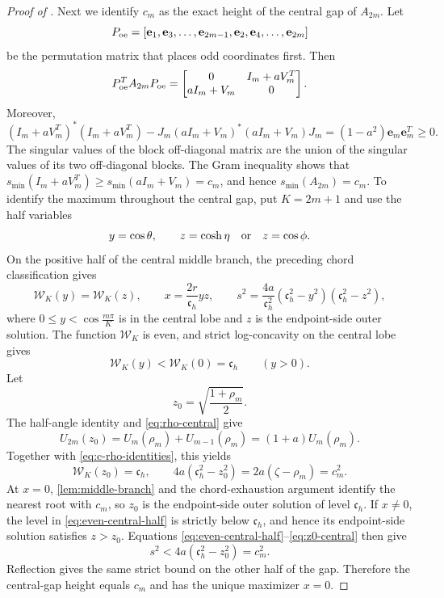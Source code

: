 \documentclass[12pt,anonymous]{iopjournal}
\numberwithin{equation}{section}
\theoremstyle{remark}
\begin{document}
\begin{proof}[Proof of ]
Next we identify \(c_m\) as the exact height of the central gap of
\(A_{2m}\).  Let
\[
 P_{\rm oe}=[\mathbf e_1,\mathbf e_3,\ldots,\mathbf e_{2m-1},
 \mathbf e_2,\mathbf e_4,\ldots,\mathbf e_{2m}]
\]
be the permutation matrix that places odd coordinates first.  Then
\[
 P_{\rm oe}^T A_{2m}P_{\rm oe}=
 \begin{bmatrix}0&I_m+aV_m^T\\aI_m+V_m&0\end{bmatrix}.
\]
Moreover,
\[
 (I_m+aV_m^T)^*(I_m+aV_m^T)
 -J_m(aI_m+V_m)^*(aI_m+V_m)J_m
 =(1-a^2)\mathbf e_m\mathbf e_m^T\geq0.
\]
The singular values of the block off-diagonal matrix are the union of
the singular values of its two off-diagonal blocks.  The Gram
inequality shows that
\(s_{\min}(I_m+aV_m^T)\geq s_{\min}(aI_m+V_m)=c_m\), and hence
\(s_{\min}(A_{2m})=c_m\).  To identify the maximum throughout the central
gap, put \(K=2m+1\) and use the half
variables
\[
 y=\cos\theta,\qquad
 z=\cosh\eta\quad\hbox{or}\quad z=\cos\phi.
\]
On the positive half of the central middle branch, the preceding chord
classification gives
\begin{equation}\label{eq:even-central-half}
 \mathcal W_K(y)=\mathcal W_K(z),\qquad
 x=\frac{2r}{\mathfrak c_h}yz,\qquad
 s^2=\frac{4a}{\mathfrak c_h^2}
 (\mathfrak c_h^2-y^2)(\mathfrak c_h^2-z^2),
\end{equation}
where \(0\leq y<\cos\frac{m\pi}{K}\) is in the central lobe and
\(z\) is the
endpoint-side outer solution.  The function \(\mathcal W_K\) is even,
and strict log-concavity on the central lobe gives
\[
 \mathcal W_K(y)<\mathcal W_K(0)=\mathfrak c_h\qquad(y>0).
\]
Let
\[
 z_0=\sqrt{\frac{1+\rho_m}{2}}.
\]
The half-angle identity and \eqref{eq:rho-central} give
\[
 U_{2m}(z_0)=U_m(\rho_m)+U_{m-1}(\rho_m)
 =(1+a)U_m(\rho_m).
\]
Together with \eqref{eq:c-rho-identities}, this yields
\begin{equation}\label{eq:z0-central}
 \mathcal W_K(z_0)=\mathfrak c_h,\qquad
 4a(\mathfrak c_h^2-z_0^2)=2a(\zeta-\rho_m)=c_m^2.
\end{equation}
At \(x=0\), \cref{lem:middle-branch} and the chord-exhaustion argument
identify the nearest root with \(c_m\), so \(z_0\) is the endpoint-side
outer solution of level \(\mathfrak c_h\).  If \(x\neq0\), the level
in \eqref{eq:even-central-half} is strictly below \(\mathfrak c_h\), and hence its
endpoint-side solution satisfies \(z>z_0\).  Equations
\eqref{eq:even-central-half}--\eqref{eq:z0-central} then give
\[
 s^2<4a(\mathfrak c_h^2-z_0^2)=c_m^2.
\]
Reflection gives the same strict bound on the other half of the gap.
Therefore the central-gap height equals \(c_m\) and has the unique maximizer
\(x=0\).


\end{proof}
\end{document}

